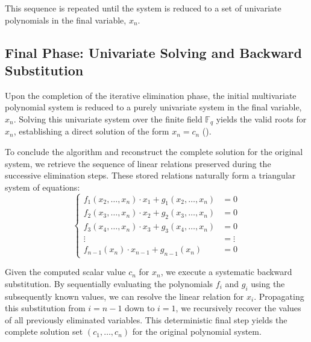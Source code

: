 This sequence is repeated until the system is reduced to a set of univariate polynomials in the final variable, $x_n$.

\subsection{Final Phase: Univariate Solving and Backward Substitution}

Upon the completion of the iterative elimination phase, the initial multivariate polynomial system is reduced to a purely univariate system in the final variable, $x_n$. Solving this univariate system over the finite field $\mathbb{F}_q$ yields the valid roots for $x_n$, establishing a direct solution of the form $x_n = c_n$ ().

To conclude the algorithm and reconstruct the complete solution for the original system, we retrieve the sequence of linear relations preserved during the successive elimination steps. These stored relations naturally form a triangular system of equations:
\begin{equation}
\left\{
\begin{aligned}
    f_1(x_2, \dots, x_n)\cdot x_1 + g_1(x_2, \dots, x_n) &= 0 \\
    f_2(x_3, \dots, x_n)\cdot x_2 + g_2(x_3, \dots, x_n) &= 0 \\
    f_3(x_4, \dots, x_n)\cdot x_3 + g_3(x_4, \dots, x_n) &= 0 \\
    \vdots &= \vdots \\
    f_{n-1}(x_n)\cdot x_{n-1} + g_{n-1}(x_n) &= 0
\end{aligned}
\right.
\label{eq:system}
\end{equation}

Given the computed scalar value $c_n$ for $x_n$, we execute a systematic backward substitution. By sequentially evaluating the polynomials $f_i$ and $g_i$ using the subsequently known values, we can resolve the linear relation for $x_i$. Propagating this substitution from $i = n-1$ down to $i = 1$, we recursively recover the values of all previously eliminated variables. This deterministic final step yields the complete solution set $(c_1, \dots, c_n)$ for the original polynomial system.







